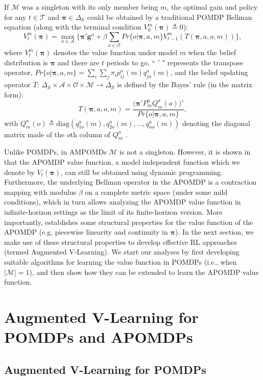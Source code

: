 \documentclass[opre,nonblindrev]{informs2}%
\newcommand{\teq}{\triangleq}
\newcommand{\1}{\hbox{\rm 1\kern-.35em 1}}
\newcommand{\MS}{\mathscr S}
\newcommand{\MA}{\mathscr A}
\newcommand{\MO}{\mathscr O}
\newcommand{\MT}{\mathscr T}
\newcommand{\MM}{\mathscr M}
\newcommand{\g}{\mathbf{g}}
\newcommand{\bpi}{\boldsymbol{\pi}}
\begin{document}
If $\MM$ was a singleton with its only member being $m$, the optimal gain and policy for any $t\in\MT$ and $\bpi \in \Delta_\MS$ could be obtained by a traditional POMDP Bellman equation (along with the terminal condition $V_0^m(\bpi)\teq 0$):
\begin{equation}\label{traditional}
V^m_t(\bpi)=\max_{a\in \MA}\Big\{\bpi'\g^a+\beta\sum_{o\in\MO} Pr\{o|\bpi,a, m\}V^m_{t-1}(T(\bpi, a, o, m))\Big\},
\end{equation}
where $V^m_t(\bpi)$ denotes the value function under model $m$ when the belief distribution is $\bpi$ and there are $t$ periods to go,  `` $'$ " represents the transpose operator,   $Pr\{o|\bpi,a, m\}=\sum_i\sum_j \pi_i p_{ij}^a (m) q_{jo}^a (m)$, and the belief updating  operator $T:\, \Delta_\MS\times \MA\times\MO\times\MM\to\Delta_\MS$  is defined by the Bayes' rule (in the matrix form):
\begin{equation}\label{beliefupd}
T(\bpi, a, o, m)=\frac{\big(\bpi'P^a_m Q^a_m(o)\big)'}{Pr\{o|\bpi, a, m\}},
\end{equation}
with $Q^a_m(o)\teq\text{diag} (q^a_{1o}(m), q^a_{2o}(m),\ldots, q^a_{no}(m))$ denoting the diagonal matrix made of the $o$th column of $Q^a_m$ \citep{Saghafian2018}.


Unlike POMDPs, in AMPOMDs $\MM$ is not  a singleton. However, it is shown in \cite{Saghafian2018} that  the APOMDP value function, a model independent function which we denote by $V_t(\bpi)$,  can still be obtained using dynamic programming. Furthermore,   the underlying Bellman operator in the APOMDP is a contraction mapping with modulus $\beta$ on a complete metric space (under some mild conditions), which in turn allows analyzing the APOMDP value function in infinite-horizon settings as the limit of its finite-horizon version. More importantly, \cite{Saghafian2018} establishes some structural properties for the value function of the APOMDP (e.g, piecewise linearity and continuity in $\bpi$). In the next section, we make use of these structural properties to develop effective RL  approaches (termed Augmented V-Learning).  We start our analyses by first developing suitable algorithms for learning the value function in POMDPs (i.e., when $|\MM|=1$), and then show how they can  be extended to learn the APOMDP value function.

\section{Augmented V-Learning for POMDPs and APOMDPs}
\subsection{Augmented V-Learning  for POMDPs}\label{sec:AVPOMDP}
\end{document}
